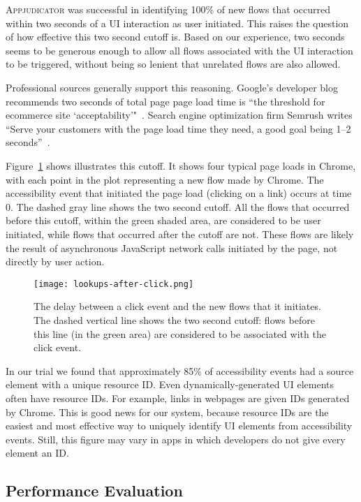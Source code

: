 \textsc{Appjudicator} was successful in identifying 100\% of new flows that
occurred within two seconds of a UI interaction as user initiated. This raises
the question of how effective this two second cutoff is. Based on our
experience, two seconds seems to be generous enough to allow all flows
associated with the UI interaction to be triggered, without being so lenient
that unrelated flows are also allowed.

Professional sources generally support this reasoning. Google's developer blog
recommends two seconds of total page page load time is ``the threshold for
ecommerce site `acceptability'"~\cite{ohye2010}. Search engine optimization firm
Semrush writes ``Serve your customers with the page load time they need, a good
goal being 1--2 seconds''~\cite{bird2020}.

Figure~\ref{fig:lookups-after-click} shows illustrates this cutoff. It shows
four typical page loads in Chrome, with each point in the plot representing a
new flow made by Chrome. The accessibility event that initiated the page load
(clicking on a link) occurs at time 0. The dashed gray line shows the two second
cutoff. All the flows that occurred before this cutoff, within the green shaded
area, are considered to be user initiated, while flows that occurred after the
cutoff are not. These flows are likely the result of asynchronous JavaScript
network calls initiated by the page, not directly by user action.

\begin{figure}[h]
    \centering
	\texttt{[image: lookups-after-click.png]}
	\caption{The delay between a click event and the new flows that it
		initiates. The dashed vertical line shows the two second cutoff: flows
		before this line (in the green area) are considered to be associated
		with the click event.}
	\label{fig:lookups-after-click}
\end{figure}

In our trial we found that approximately 85\% of accessibility events had a
source element with a unique resource ID. Even dynamically-generated UI elements
often have resource IDs. For example, links in webpages are given IDs generated
by Chrome. This is good news for our system, because resource IDs are the
easiest and most effective way to uniquely identify UI elements from
accessibility events. Still, this figure may vary in apps in which developers do
not give every element an ID.

\subsection{Performance Evaluation}
\label{sec:performance-evaluation}

